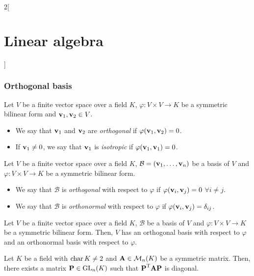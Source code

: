 \documentclass[../../../main_math.tex]{subfiles}
\begin{document}
\begin{multicols}{2}[\section{Linear algebra}]
  \subsubsection{Orthogonal basis}
  \begin{definition}\label{LA_isotrop}
    Let $V$ be a finite vector space over a field $K$, $\varphi:V\times V\rightarrow K$ be a symmetric bilinear form and $\boldsymbol{\mathrm{v}}_1,\boldsymbol{\mathrm{v}}_2\in V$.
    \begin{itemize}
      \item We say that $\boldsymbol{\mathrm{v}}_1$ and $\boldsymbol{\mathrm{v}}_2$ are \emph{orthogonal} if $\varphi(\boldsymbol{\mathrm{v}}_1,\boldsymbol{\mathrm{v}}_2)=0$.
      \item If $\boldsymbol{\mathrm{v}}_1\ne 0$, we say that $\boldsymbol{\mathrm{v}}_1$ is \emph{isotropic} if $\varphi(\boldsymbol{\mathrm{v}}_1,\boldsymbol{\mathrm{v}}_1)=0$.
    \end{itemize}
  \end{definition}
  \begin{definition}
    Let $V$ be a finite vector space over a field $K$, $\mathcal{B}=(\boldsymbol{\mathrm{v}}_1,\ldots,\boldsymbol{\mathrm{v}}_n)$ be a basis of $V$ and $\varphi:V\times V\rightarrow K$ be a symmetric bilinear form.
    \begin{itemize}
      \item We say that $\mathcal{B}$ is \emph{orthogonal} with respect to $\varphi$ if $\varphi(\boldsymbol{\mathrm{v}}_i,\boldsymbol{\mathrm{v}}_j)=0$ $\forall i\ne j$.
      \item We say that $\mathcal{B}$ is \emph{orthonormal} with respect to $\varphi$ if $\varphi(\boldsymbol{\mathrm{v}}_i,\boldsymbol{\mathrm{v}}_j)=\delta_{ij}$.
    \end{itemize}
  \end{definition}
  \begin{theorem}
    Let $V$ be a finite vector space over a field $K$, $\mathcal{B}$ be a basis of $V$ and $\varphi:V\times V\rightarrow K$ be a symmetric bilinear form. Then, $V$ has an orthogonal basis with respect to $\varphi$ and an orthonormal basis with respect to $\varphi$.
  \end{theorem}
  \begin{corollary}
    Let $K$ be a field with $\operatorname{char} K\ne 2$ and $\boldsymbol{\mathrm{A}}\in\mathcal{M}_n(K)$ be a symmetric matrix. Then, there exists a matrix $\boldsymbol{\mathrm{P}}\in\mathrm{GL}_n(K)$ such that ${\boldsymbol{\mathrm{P}}}^{\mathrm{T}}\boldsymbol{\mathrm{A}}\boldsymbol{\mathrm{P}}$ is diagonal.
  \end{corollary}

\end{multicols}
\end{document}
